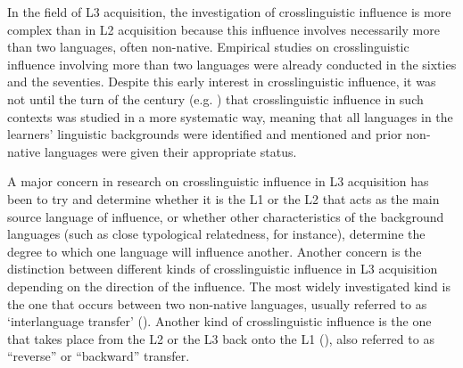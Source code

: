 \documentclass[output=paper,colorlinks,citecolor=brown,nonflat]{../langscibook}
\begin{document}
In the field of L3 acquisition, the investigation of crosslinguistic influence is more complex than in L2 acquisition because this influence involves necessarily more than two languages, often non-native. Empirical studies on crosslinguistic influence involving more than two languages were already conducted in the sixties and the seventies. Despite this early interest in crosslinguistic influence, it was not until the turn of the century (e.g. \citealt{WilliamsHammarberg1998, CenozEtAl2001}) that crosslinguistic influence in such contexts was studied in a more systematic way, meaning that all languages in the learners’ linguistic backgrounds were identified and mentioned and prior non-native languages were given their appropriate status.

A major concern in research on crosslinguistic influence in L3 acquisition has been to try and determine whether it is the L1 or the L2 that acts as the main source language of influence, or whether other characteristics of the background languages (such as close typological relatedness, for instance), determine the degree to which one language will influence another. Another concern is the distinction between different kinds of crosslinguistic influence in L3 acquisition depending on the direction of the influence. The most widely investigated kind is the one that occurs between two non-native languages, usually referred to as ‘interlanguage transfer’ (\citealt{DeAngelisSelinker2001}). Another kind of crosslinguistic influence is the one that takes place from the L2 or the L3 back onto the L1 (\citealt{KecskesPapp2000}), also referred to as “reverse” or “backward” transfer.
\end{document}
